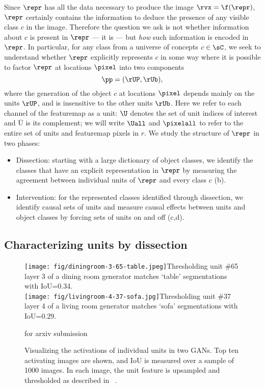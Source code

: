 \documentclass{article} %
\def\arxiv{for arxiv submission}
\begin{document}
Since $\repr$ has all the data necessary to produce the image $\rvx = \f(\repr)$, $\repr$ certainly contains the information to deduce the presence of any visible class $c$ in the image.  Therefore the question we ask is not whether information about $c$ is present in $\repr$ --- it is --- but \textit{how} such information is encoded in $\repr$.
In particular, for any class from a universe of concepts $c \in \sC$, we seek to understand whether $\repr$ explicitly represents $c$ in some way where it is possible to factor $\repr$ at locations $\pixel$ into two components
\vspace{-5pt}\begin{equation}
\pp = (\rUP, \rUb),
\end{equation}
where the generation of the object $c$ at locations $\pixel$ depends mainly on the units $\rUP$, and is insensitive to the other units $\rUb$.  Here we refer to each channel of the featuremap as a unit: $\U$ denotes the set of unit indices of interest and $\overline{\text{U}}$ is its complement; we will write $\Uall$ and $\pixelall$ to refer to the entire set of units and featuremap pixels in $r$.  We study the structure of $\repr$ in two phases:
\vspace{-5pt}\begin{itemize}[noitemsep,topsep=0pt]
\item Dissection: starting with a large dictionary of object classes, we identify the classes that have an explicit representation in $\repr$ by measuring the agreement between individual units of $\repr$ and every class $c$ (b).
\item Intervention: for the represented classes identified through dissection, we identify causal sets of units and measure causal effects between units and object classes by forcing sets of units on and off (c,d).
\end{itemize}\subsection{Characterizing units by dissection}\begin{figure}[t]
\vspace{-10pt}
\centering
\texttt{[image: fig/diningroom-3-65-table.jpeg]}{\small Thresholding unit \#65 layer 3 of a dining room generator matches `table' segmentations with IoU=0.34.} \\
\vspace{1mm}
\texttt{[image: fig/livingroom-4-37-sofa.jpg]}{\small Thresholding unit \#37 layer 4 of a living room generator matches `sofa' segmentations with IoU=0.29.}
\vspace{-5pt}
\caption{Visualizing the activations of individual units in two GANs.  Top ten activating images are shown, and IoU is measured over a sample of 1000 images. In each image, the unit feature is upsampled and thresholded as described in ~.}
\ifdefined\arxiv
\vspace{-10pt}
\else
\vspace{-10pt}
\fi
\end{figure}
\end{document}

